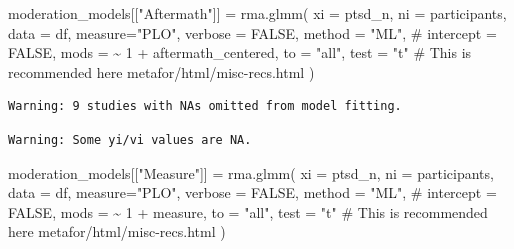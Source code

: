 \documentclass[
  letterpaper,
  DIV=11,
  numbers=noendperiod]{scrartcl}
\newenvironment{Shaded}{\begin{snugshade}}{\end{snugshade}}
\newcommand{\AttributeTok}[1]{\textcolor[rgb]{0.40,0.45,0.13}{#1}}
\newcommand{\CommentTok}[1]{\textcolor[rgb]{0.37,0.37,0.37}{#1}}
\newcommand{\ConstantTok}[1]{\textcolor[rgb]{0.56,0.35,0.01}{#1}}
\newcommand{\DecValTok}[1]{\textcolor[rgb]{0.68,0.00,0.00}{#1}}
\newcommand{\FunctionTok}[1]{\textcolor[rgb]{0.28,0.35,0.67}{#1}}
\newcommand{\NormalTok}[1]{\textcolor[rgb]{0.00,0.23,0.31}{#1}}
\newcommand{\OtherTok}[1]{\textcolor[rgb]{0.00,0.23,0.31}{#1}}
\newcommand{\SpecialCharTok}[1]{\textcolor[rgb]{0.37,0.37,0.37}{#1}}
\newcommand{\StringTok}[1]{\textcolor[rgb]{0.13,0.47,0.30}{#1}}
\begin{document}
\begin{Shaded}
\begin{Highlighting}[]
\NormalTok{moderation\_models[[}\StringTok{"Aftermath"}\NormalTok{]] }\OtherTok{=} \FunctionTok{rma.glmm}\NormalTok{(}
  \AttributeTok{xi =} \StringTok{\textasciigrave{}}\AttributeTok{ptsd\_n}\StringTok{\textasciigrave{}}\NormalTok{, }
  \AttributeTok{ni =} \StringTok{\textasciigrave{}}\AttributeTok{participants}\StringTok{\textasciigrave{}}\NormalTok{, }
  \AttributeTok{data =}\NormalTok{ df, }
  \AttributeTok{measure=}\StringTok{"PLO"}\NormalTok{,}
  \AttributeTok{verbose =} \ConstantTok{FALSE}\NormalTok{,}
  \AttributeTok{method =} \StringTok{"ML"}\NormalTok{,}
  \CommentTok{\# intercept = FALSE,}
  \AttributeTok{mods =} \SpecialCharTok{\textasciitilde{}} \DecValTok{1} \SpecialCharTok{+}\NormalTok{ aftermath\_centered,}
  \AttributeTok{to =} \StringTok{"all"}\NormalTok{,}
  \AttributeTok{test =} \StringTok{"t"} \CommentTok{\# This is recommended here metafor/html/misc{-}recs.html}
\NormalTok{)}
\end{Highlighting}
\end{Shaded}

\begin{verbatim}
Warning: 9 studies with NAs omitted from model fitting.
\end{verbatim}

\begin{verbatim}
Warning: Some yi/vi values are NA.
\end{verbatim}

\begin{Shaded}
\begin{Highlighting}[]
\NormalTok{moderation\_models[[}\StringTok{"Measure"}\NormalTok{]] }\OtherTok{=} \FunctionTok{rma.glmm}\NormalTok{(}
  \AttributeTok{xi =} \StringTok{\textasciigrave{}}\AttributeTok{ptsd\_n}\StringTok{\textasciigrave{}}\NormalTok{, }
  \AttributeTok{ni =} \StringTok{\textasciigrave{}}\AttributeTok{participants}\StringTok{\textasciigrave{}}\NormalTok{, }
  \AttributeTok{data =}\NormalTok{ df, }
  \AttributeTok{measure=}\StringTok{"PLO"}\NormalTok{,}
  \AttributeTok{verbose =} \ConstantTok{FALSE}\NormalTok{,}
  \AttributeTok{method =} \StringTok{"ML"}\NormalTok{,}
  \CommentTok{\# intercept = FALSE,}
  \AttributeTok{mods =} \SpecialCharTok{\textasciitilde{}} \DecValTok{1} \SpecialCharTok{+}\NormalTok{ measure,}
  \AttributeTok{to =} \StringTok{"all"}\NormalTok{,}
  \AttributeTok{test =} \StringTok{"t"} \CommentTok{\# This is recommended here metafor/html/misc{-}recs.html}
\NormalTok{)}
\end{Highlighting}
\end{Shaded}
\end{document}
